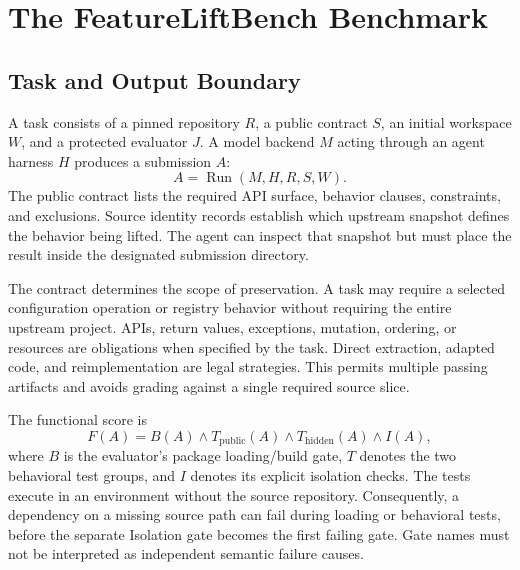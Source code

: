 \documentclass[acmsmall,screen,review,anonymous]{acmart}
\begin{document}

\section{The FeatureLiftBench Benchmark}
\label{sec:benchmark}

\subsection{Task and Output Boundary}

A task consists of a pinned repository $R$, a public contract $S$, an initial
workspace $W$, and a protected evaluator $J$. A model backend $M$ acting through
an agent harness $H$ produces a submission $A$:
\begin{equation}
 A = \operatorname{Run}(M,H,R,S,W).
\end{equation}
The public contract lists the required API surface, behavior clauses, constraints,
and exclusions. Source identity records establish which upstream snapshot defines
the behavior being lifted. The agent can inspect that snapshot but must place the
result inside the designated submission directory.

The contract determines the scope of preservation. A task may require a selected
configuration operation or registry behavior without requiring the entire
upstream project. APIs, return values, exceptions, mutation, ordering, or resources
are obligations when specified by the task. Direct extraction, adapted code, and
reimplementation are legal strategies. This permits multiple passing artifacts
and avoids grading against a single required source slice.

The functional score is
\begin{equation}
 F(A)=B(A)\land T_{\mathrm{public}}(A)\land T_{\mathrm{hidden}}(A)\land I(A),
 \label{eq:functional}
\end{equation}
where $B$ is the evaluator's package loading/build gate, $T$ denotes the two
behavioral test groups, and $I$ denotes its explicit isolation checks. The tests
execute in an environment without the source repository. Consequently, a
dependency on a missing source path can fail during loading or behavioral tests,
before the separate Isolation gate becomes the first failing gate. Gate names
must not be interpreted as independent semantic failure causes.
\end{document}
